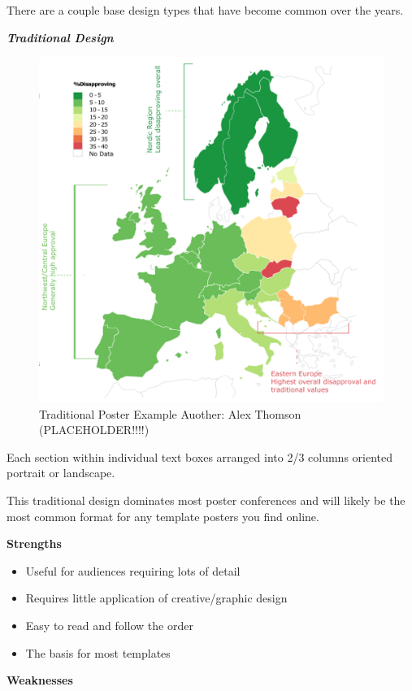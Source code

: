 \documentclass[
]{book}
\providecommand{\tightlist}{%
  \setlength{\itemsep}{0pt}\setlength{\parskip}{0pt}}
\begin{document}
There are a couple base design types that have become common over the years.

\textbf{\emph{Traditional Design}}

\begin{figure}
\centering
\includegraphics{img/Map.png}
\caption{Traditional Poster Example Auother: Alex Thomson (PLACEHOLDER!!!!)}
\end{figure}

Each section within individual text boxes arranged into 2/3 columns oriented portrait or landscape.

This traditional design dominates most poster conferences and will likely be the most common format for any template posters you find online.

\textbf{Strengths}

\begin{itemize}
\tightlist
\item
  Useful for audiences requiring lots of detail
\item
  Requires little application of creative/graphic design
\item
  Easy to read and follow the order
\item
  The basis for most templates
\end{itemize}

\textbf{Weaknesses}
\end{document}
